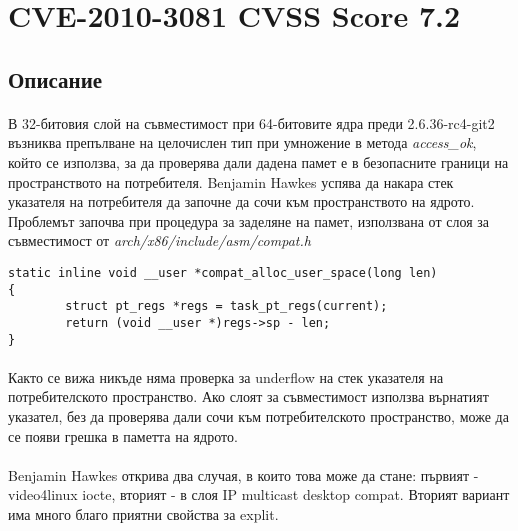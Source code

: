 \documentclass[a4paper,12pt,leqno]{article}
\begin{document}
\section{CVE-2010-3081 CVSS Score 7.2}
\subsection{Описание}
\paragraph{}
В 32-битовия слой на съвместимост при 64-битовите ядра преди 2.6.36-rc4-git2 възниква препълване на целочислен тип при умножение в метода \textit{access\_ok}, който се използва, за да проверява дали дадена памет е в безопасните граници на пространството на потребителя. Benjamin Hawkes успява да накара стек указателя на потребителя да започне да сочи към пространството на ядрото. Проблемът започва при процедура за заделяне на памет, използвана от слоя за съвместимост от \textit{arch/x86/include/asm/compat.h}

\begin{verbatim}
static inline void __user *compat_alloc_user_space(long len)                    
{                                                                               
        struct pt_regs *regs = task_pt_regs(current);                           
        return (void __user *)regs->sp - len;                                   
}
\end{verbatim}
\paragraph{}
Както се вижа никъде няма проверка за underflow на стек указателя на потребителското пространство. Ако слоят за съвместимост използва върнатият указател, без да проверява дали сочи към потребителското пространство, може да се появи грешка в паметта на ядрото.
\paragraph{}
Benjamin Hawkes открива два случая, в които това може да стане: първият - video4linux iocte, вторият - в слоя IP multicast desktop compat. Вторият вариант има много благо приятни свойства за explit.
\end{document}
